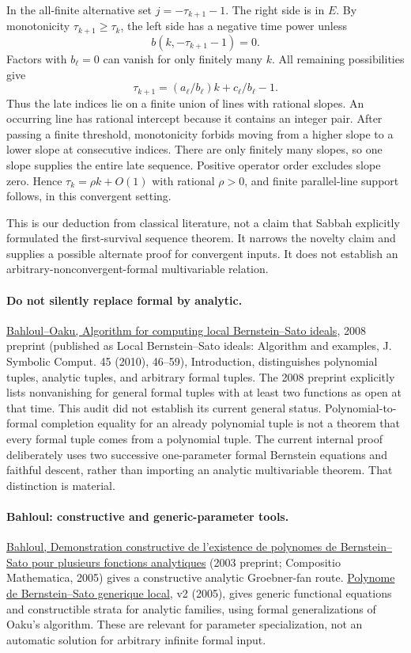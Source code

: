 \documentclass[11pt]{article}
\begin{document}
In the all-finite alternative set $j=-\tau_{k+1}-1$. The right side is in $E$. By monotonicity $\tau_{k+1}\ge\tau_k$, the left side has a negative time power unless
\[
 b(k,-\tau_{k+1}-1)=0.
\]
Factors with $b_\ell=0$ can vanish for only finitely many $k$. All remaining possibilities give
\[
 \tau_{k+1}=(a_\ell/b_\ell)k+c_\ell/b_\ell-1.
\]
Thus the late indices lie on a finite union of lines with rational slopes. An occurring line has rational intercept because it contains an integer pair. After passing a finite threshold, monotonicity forbids moving from a higher slope to a lower slope at consecutive indices. There are only finitely many slopes, so one slope supplies the entire late sequence. Positive operator order excludes slope zero. Hence $\tau_k=\rho k+O(1)$ with rational $\rho>0$, and finite parallel-line support follows, in this convergent setting.

This is our deduction from classical literature, not a claim that Sabbah explicitly formulated the first-survival sequence theorem. It narrows the novelty claim and supplies a possible alternate proof for convergent inputs. It does not establish an arbitrary-nonconvergent-formal multivariable relation.

\paragraph{Do not silently replace formal by analytic.}
\href{https://arxiv.org/abs/0806.4869}{Bahloul--Oaku, Algorithm for computing local Bernstein--Sato ideals}, 2008 preprint (published as Local Bernstein--Sato ideals: Algorithm and examples, J. Symbolic Comput. 45 (2010), 46--59), Introduction, distinguishes polynomial tuples, analytic tuples, and arbitrary formal tuples. The 2008 preprint explicitly lists nonvanishing for general formal tuples with at least two functions as open at that time. This audit did not establish its current general status. Polynomial-to-formal completion equality for an already polynomial tuple is not a theorem that every formal tuple comes from a polynomial tuple. The current internal proof deliberately uses two successive one-parameter formal Bernstein equations and faithful descent, rather than importing an analytic multivariable theorem. That distinction is material.

\paragraph{Bahloul: constructive and generic-parameter tools.}
\href{https://arxiv.org/abs/math/0307179}{Bahloul, Demonstration constructive de l'existence de polynomes de Bernstein--Sato pour plusieurs fonctions analytiques} (2003 preprint; Compositio Mathematica, 2005) gives a constructive analytic Groebner-fan route. \href{https://arxiv.org/abs/math/0410046}{Polynome de Bernstein--Sato generique local}, v2 (2005), gives generic functional equations and constructible strata for analytic families, using formal generalizations of Oaku's algorithm. These are relevant for parameter specialization, not an automatic solution for arbitrary infinite formal input.
\end{document}
